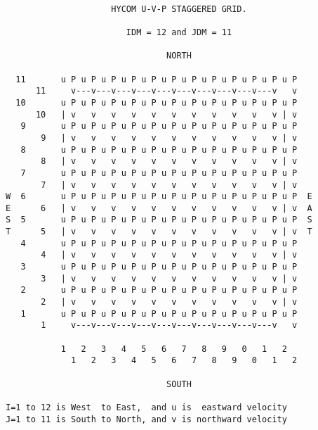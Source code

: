 \pagebreak
{\tt
\begin{verbatim}
                     HYCOM U-V-P STAGGERED GRID.

                        IDM = 12 and JDM = 11

                                NORTH

  11       u P u P u P u P u P u P u P u P u P u P u P u P
      11     v---v---v---v---v---v---v---v---v---v---v   v
  10       u P u P u P u P u P u P u P u P u P u P u P u P
      10   | v   v   v   v   v   v   v   v   v   v   v | v
   9       u P u P u P u P u P u P u P u P u P u P u P u P
       9   | v   v   v   v   v   v   v   v   v   v   v | v
   8       u P u P u P u P u P u P u P u P u P u P u P u P
       8   | v   v   v   v   v   v   v   v   v   v   v | v
   7       u P u P u P u P u P u P u P u P u P u P u P u P
       7   | v   v   v   v   v   v   v   v   v   v   v | v
W  6       u P u P u P u P u P u P u P u P u P u P u P u P  E
E      6   | v   v   v   v   v   v   v   v   v   v   v | v  A
S  5       u P u P u P u P u P u P u P u P u P u P u P u P  S
T      5   | v   v   v   v   v   v   v   v   v   v   v | v  T
   4       u P u P u P u P u P u P u P u P u P u P u P u P
       4   | v   v   v   v   v   v   v   v   v   v   v | v
   3       u P u P u P u P u P u P u P u P u P u P u P u P
       3   | v   v   v   v   v   v   v   v   v   v   v | v
   2       u P u P u P u P u P u P u P u P u P u P u P u P
       2   | v   v   v   v   v   v   v   v   v   v   v | v
   1       u P u P u P u P u P u P u P u P u P u P u P u P
       1     v---v---v---v---v---v---v---v---v---v---v   v
 
           1   2   3   4   5   6   7   8   9   0   1   2
             1   2   3   4   5   6   7   8   9   0   1   2

                                SOUTH

I=1 to 12 is West  to East,  and u is  eastward velocity
J=1 to 11 is South to North, and v is northward velocity
\end{verbatim}
}


